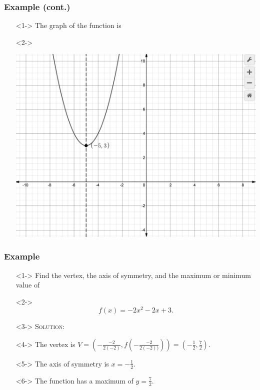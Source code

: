 \documentclass[handout]{beamer}
\begin{document}
\begin{frame}
	\frametitle{Example (cont.)}
	\begin{enumerate}
		\item[]<1-> The graph of the function is
		\item[]<2->\begin{center}
				\includegraphics[scale=0.25]{3_3_2.png}
			\end{center}
	\end{enumerate}
\end{frame}

\begin{frame}
	\frametitle{Example}
	\begin{enumerate}
		\item[]<1-> Find the vertex, the axis of symmetry, and the maximum or minimum value of
		\item[]<2->\[ f(x)=-2x^{2}-2x+3. \]
		\item[]<3-> \textsc{Solution:}
		\item[]<4-> The vertex is $V=\left( -\frac{-2}{2(-2)}, f \left( -\frac{-2}{2(-2))} \right)\right)=\left( -\frac{1}{2}, \frac{7}{2}\right)$.
		\item[]<5-> The axis of symmetry is $x=-\frac{1}{2}$.
		\item[]<6-> The function has a maximum of $y=\frac{7}{2}$.
	\end{enumerate}
\end{frame}
\end{document}
